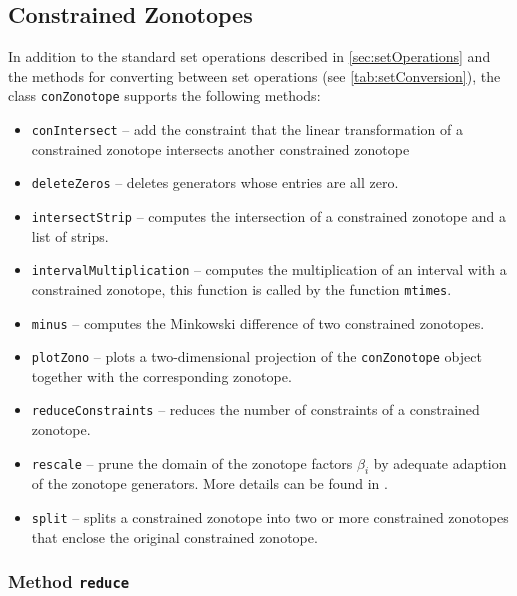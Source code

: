 
\subsection{Constrained Zonotopes}    \label{sec:conZonotopeOperations}

In addition to the standard set operations described in \cref{sec:setOperations} and the methods for converting between set operations (see \cref{tab:setConversion}), the class \texttt{conZonotope} supports the following methods:

\begin{itemize}
    \item \texttt{conIntersect} -- add the constraint that the linear transformation of a constrained zonotope intersects another constrained zonotope
    \item \texttt{deleteZeros} -- deletes generators whose entries are all zero.
    \item \texttt{intersectStrip} -- computes the intersection of a constrained zonotope and a list of strips.
    \item \texttt{intervalMultiplication} -- computes the multiplication of an interval with a constrained zonotope,
    this function is called by the function \texttt{mtimes}.
    \item \texttt{minus} -- computes the Minkowski difference of two constrained zonotopes.
    \item \texttt{plotZono} -- plots a two-dimensional projection of the \texttt{conZonotope} object together with the corresponding zonotope.
    \item \texttt{reduceConstraints} -- reduces the number of constraints of a constrained zonotope.
    \item \texttt{rescale} -- prune the domain of the zonotope factors $\beta_i$ by adequate adaption of the zonotope generators. More details can be found in \cite{Scott2016}.
    \item \texttt{split} -- splits a constrained zonotope into two or more constrained zonotopes
    that enclose the original constrained zonotope.
\end{itemize}

\subsubsection{Method \texttt{reduce}} \label{sec:conZono_reduce}

